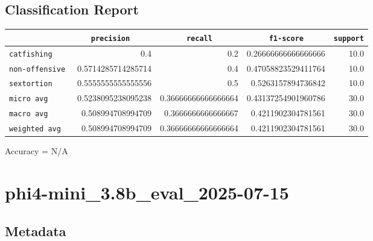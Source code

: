 \documentclass{article}
\begin{document}
\subsection{Classification Report}

\begin{center}
\begin{tabular}{l | r | r | r | r} \hline
    \verb|            | & \verb|    precision     | & \verb|      recall      | & \verb|     f1-score     | & \verb|support| \\ \hline
    \hline
    \verb|catfishing | & 0.4 & 0.2 & 0.26666666666666666 &    10.0 \\ \hline
    \verb|non-offensive| & 0.5714285714285714 & 0.4 & 0.47058823529411764 &    10.0 \\ \hline
    \verb|sextortion | & 0.5555555555555556 & 0.5 & 0.5263157894736842 &    10.0 \\ \hline
    \verb|micro avg  | & 0.5238095238095238 & 0.36666666666666664 & 0.43137254901960786 &    30.0 \\ \hline
    \verb|macro avg  | & 0.508994708994709 & 0.3666666666666667 & 0.4211902304781561 &    30.0 \\ \hline
    \verb|weighted avg| & 0.508994708994709 & 0.36666666666666664 & 0.4211902304781561 &    30.0 \\ \hline
\end{tabular}
\end{center}

\begin{center}
Accuracy = N/A
\end{center}

\section{phi4-mini\_3.8b\_eval\_2025-07-15}
\subsection{Metadata}
\end{document}
